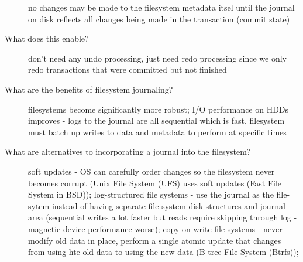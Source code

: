\documentclass[10pt]{article}
\begin{document}
\begin{description}
  no changes may be made to the filesystem metadata itsel until the journal on disk reflects all changes being made in the transaction (commit state)
\item[What does this enable?]
  don't need any undo processing, just need redo processing since we only redo transactions that were committed but not finished
\item[What are the benefits of filesystem journaling?]
  filesystems become significantly more robust;
  I/O performance on HDDs improves - logs to the journal are all sequential which is fast, filesystem must batch up writes to data and metadata to perform at specific times
\item[What are alternatives to incorporating a journal into the filesystem?]
  soft updates - OS can carefully order changes so the filesystem never becomes corrupt (Unix File System (UFS) uses soft updates (Fast File System in BSD));
  log-structured file systems - use the journal as the file-sytem instead of having separate file-system disk structures and journal area
  (sequential writes a lot faster but reads require skipping through log - magnetic device performance worse);
  copy-on-write file systems - never modify old data in place, perform a single atomic update that changes from using hte old data to using the new data (B-tree File System (Btrfs));
\end{description}
\end{document}
